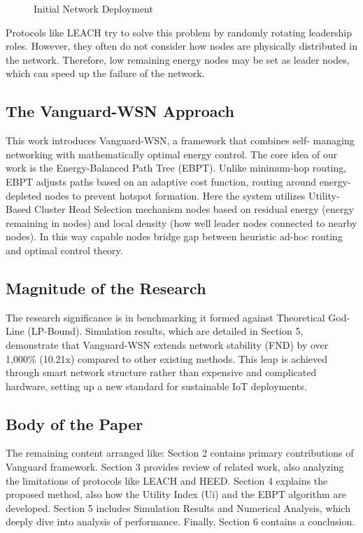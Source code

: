 \documentclass[conference]{IEEEtran}
\begin{document}
\begin{figure}[htbp]
\centerline{}
\caption{Initial Network Deployment}
\label{fig2}
\end{figure}

Protocols like LEACH try to solve this problem by randomly rotating leadership roles. However, they often do not consider how nodes are physically distributed in the network. Therefore, low remaining energy nodes may be set as leader nodes, which can speed up the failure of the network.

\subsection{The Vanguard-WSN Approach}
This work introduces Vanguard-WSN, a framework that combines self- managing networking with mathematically optimal energy control. The core idea of our work is the Energy-Balanced Path Tree (EBPT). Unlike minimum-hop routing, EBPT adjusts paths based on an adaptive cost function, routing around energy-depleted nodes to prevent hotspot formation.
Here the system utilizes Utility-Based Cluster Head Selection mechanism nodes based on residual energy (energy remaining in nodes) and local density (how well leader nodes connected to nearby nodes). In this way capable nodes bridge gap between heuristic ad-hoc routing and optimal control theory.

\subsection{Magnitude of the Research}
The research significance is in benchmarking it formed against Theoretical God-Line (LP-Bound). Simulation results, which are detailed in Section 5, demonstrate that Vanguard-WSN extends network stability (FND) by over 1,000\% (10.21x) compared to other existing methods. This leap is achieved through smart network structure rather than expensive and complicated hardware, setting up a new standard for sustainable IoT deployments.

\subsection{Body of the Paper}
The remaining content arranged like: Section 2 contains primary contributions of Vanguard framework. Section 3 provides review of related work, also analyzing the limitations of protocols like LEACH and HEED. Section 4 explains the proposed method, also how the Utility Index (Ui) and the EBPT algorithm are developed. Section 5 includes Simulation Results and Numerical Analysis, which deeply dive into analysis of performance. Finally, Section 6 contains a conclusion.
\end{document}
